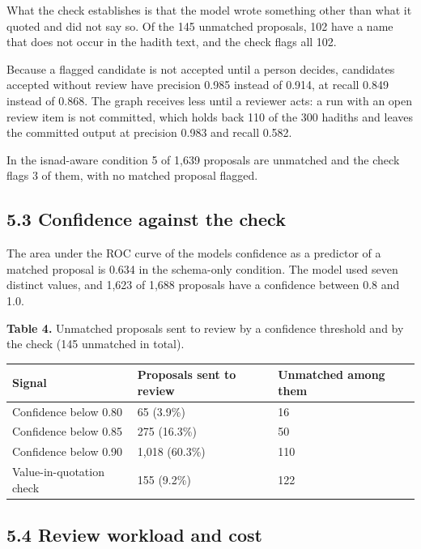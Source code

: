 \documentclass[
  english,
]{article}
\newcounter{none} %
\begin{document}
What the check establishes is that the model wrote something other than
what it quoted and did not say so. Of the 145 unmatched proposals, 102
have a name that does not occur in the hadith text, and the check flags
all 102.

Because a flagged candidate is not accepted until a person decides,
candidates accepted without review have precision 0.985 instead of
0.914, at recall 0.849 instead of 0.868. The graph receives less until a
reviewer acts: a run with an open review item is not committed, which
holds back 110 of the 300 hadiths and leaves the committed output at
precision 0.983 and recall 0.582.

In the isnad-aware condition 5 of 1,639 proposals are unmatched and the
check flags 3 of them, with no matched proposal flagged.

\subsection{5.3 Confidence against the
check}\label{confidence-against-the-check}

The area under the ROC curve of the model\textquotesingle s confidence
as a predictor of a matched proposal is 0.634 in the schema-only
condition. The model used seven distinct values, and 1,623 of 1,688
proposals have a confidence between 0.8 and 1.0.

\textbf{Table 4.} Unmatched proposals sent to review by a confidence
threshold and by the check (145 unmatched in total).

{\def\LTcaptype{none} %
\begin{longtable}[]{@{}lll@{}}
\toprule\noalign{}
Signal & Proposals sent to review & Unmatched among them \\
\midrule\noalign{}
\endhead
\bottomrule\noalign{}
\endlastfoot
Confidence below 0.80 & 65 (3.9\%) & 16 \\
Confidence below 0.85 & 275 (16.3\%) & 50 \\
Confidence below 0.90 & 1,018 (60.3\%) & 110 \\
Value-in-quotation check & 155 (9.2\%) & 122 \\
\end{longtable}
}

\subsection{5.4 Review workload and
cost}\label{review-workload-and-cost}
\end{document}
